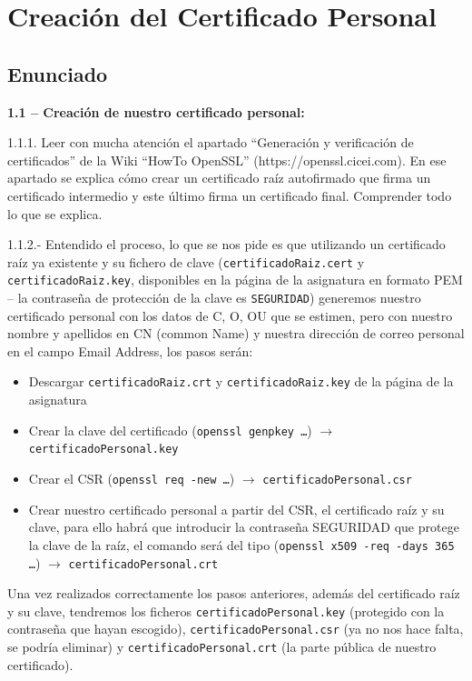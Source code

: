 \chapter{Creación del Certificado Personal}

\section{Enunciado}

\textbf{1.1 -- Creación de nuestro certificado personal:}

1.1.1. Leer con mucha atención el apartado ``Generación y verificación de certificados'' de la Wiki ``HowTo
OpenSSL'' (https://openssl.cicei.com). En ese apartado se explica cómo crear un certificado raíz autofirmado
que firma un certificado intermedio y este último firma un certificado final. Comprender todo lo que se explica.

1.1.2.- Entendido el proceso, lo que se nos pide es que utilizando un certificado raíz ya existente y su fichero
de clave (\texttt{certificadoRaiz.cert} y \texttt{certificadoRaiz.key}, disponibles en la página de la asignatura en formato PEM
-- la contraseña de protección de la clave es \texttt{SEGURIDAD}) generemos nuestro certificado personal con los
datos de C, O, OU que se estimen, pero con nuestro nombre y apellidos en CN (common Name) y nuestra
dirección de correo personal en el campo Email Address, los pasos serán:

\begin{itemize}
    \item[a)] Descargar \texttt{certificadoRaiz.crt} y \texttt{certificadoRaiz.key} de la página de la asignatura
    \item[b)] Crear la clave del certificado (\texttt{openssl genpkey \dots}) $\rightarrow$ \texttt{certificadoPersonal.key}
    \item[c)] Crear el CSR (\texttt{openssl req -new \dots}) $\rightarrow$ \texttt{certificadoPersonal.csr}
    \item[d)] Crear nuestro certificado personal a partir del CSR, el certificado raíz y su clave, para ello habrá
    que introducir la contraseña SEGURIDAD que protege la clave de la raíz, el comando será del
    tipo (\texttt{openssl x509 -req -days 365 \dots}) $\rightarrow$ \texttt{certificadoPersonal.crt}
\end{itemize}

Una vez realizados correctamente los pasos anteriores, además del certificado raíz y su clave, tendremos los
ficheros \texttt{certificadoPersonal.key} (protegido con la contraseña que hayan escogido), \texttt{certificadoPersonal.csr}
(ya no nos hace falta, se podría eliminar) y \texttt{certificadoPersonal.crt} (la parte pública de nuestro certificado).

